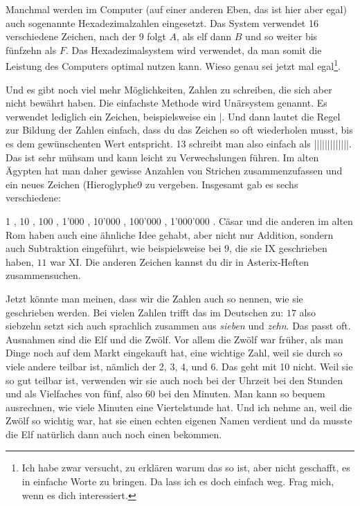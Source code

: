 Manchmal werden im Computer (auf einer anderen Eben, das ist hier aber egal) auch sogenannte Hexadezimalzahlen eingesetzt. Das System verwendet 16 verschiedene Zeichen, nach der $9$ folgt $A$, als elf dann $B$ und so weiter bis fünfzehn als $F$. Das Hexadezimalsystem wird verwendet, da man somit die Leistung des Computers optimal nutzen kann. Wieso genau sei jetzt mal egal\footnote{Ich habe zwar versucht, zu erklären warum das so ist, aber nicht geschafft, es in einfache Worte zu bringen. Da lass ich es doch einfach weg. Frag mich, wenn es dich interessiert.}.

Und es gibt noch viel mehr Möglichkeiten, Zahlen zu schreiben, die sich aber nicht bewährt haben. Die einfachste Methode wird Unärsystem genannt. Es verwendet lediglich ein Zeichen, beispielsweise ein |. Und dann lautet die Regel zur Bildung der Zahlen einfach, dass du das Zeichen so oft wiederholen musst, bis es dem gewünschenten Wert entspricht. 13 schreibt man also einfach als |||||||||||||. Das ist sehr mühsam und kann leicht zu Verwechslungen führen. Im alten Ägypten hat man daher gewisse Anzahlen von Strichen zusammenzufassen und ein neues Zeichen (Hieroglyphe9 zu vergeben. Insgesamt gab es sechs verschiedene:

1 \textpmhg{\Hone}, 10 , 100 , 1’000 , 10’000 , 100’000 , 1'000’000 . Cäsar und die anderen im alten Rom haben auch eine ähnliche Idee gehabt, aber nicht nur Addition, sondern auch Subtraktion eingeführt, wie beispielsweise bei $9$, die sie IX geschrieben haben, $11$ war XI. Die anderen Zeichen kannst du dir in Asterix-Heften zusammensuchen.

Jetzt könnte man meinen, dass wir die Zahlen auch so nennen, wie sie geschrieben werden. Bei vielen Zahlen trifft das im Deutschen zu: $17$ also siebzehn setzt sich auch sprachlich zusammen aus \textit{sieben} und \textit{zehn}. Das passt oft. Ausnahmen sind die Elf und die Zwölf. Vor allem die Zwölf war früher, als man Dinge noch auf dem Markt eingekauft hat, eine wichtige Zahl, weil sie durch so viele andere teilbar ist, nämlich der 2, 3, 4, und 6. Das geht mit 10 nicht. Weil sie so gut teilbar ist, verwenden wir sie auch noch bei der Uhrzeit bei den Stunden und als Vielfaches von fünf, also 60 bei den Minuten. Man kann so bequem ausrechnen, wie viele Minuten eine Viertelstunde hat. Und ich nehme an, weil die Zwölf so wichtig war, hat sie einen echten eigenen Namen verdient und da musste die Elf natürlich dann auch noch einen bekommen.

